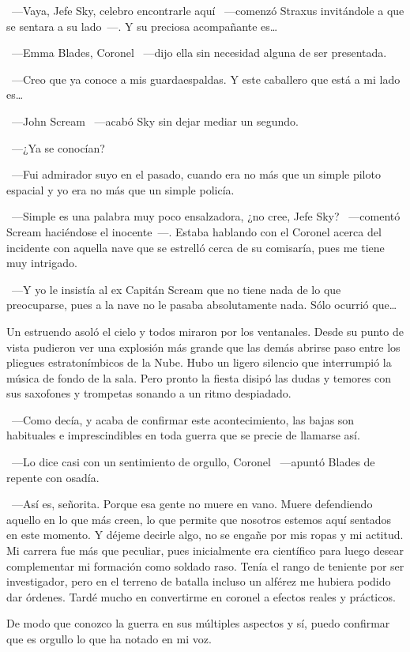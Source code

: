 ~---Vaya, Jefe Sky, celebro encontrarle aquí ~---comenzó Straxus invitándole a que se sentara a su lado~---. Y su preciosa acompañante es\dots

~---Emma Blades, Coronel ~---dijo ella sin necesidad alguna de ser presentada.

~---Creo que ya conoce a mis guardaespaldas. Y este caballero que está a mi lado es\dots

~---John Scream ~---acabó Sky sin dejar mediar un segundo.

~---¿Ya se conocían?

~---Fui admirador suyo en el pasado, cuando era no más que un simple piloto espacial y yo era no más que un simple policía.

~---Simple es una palabra muy poco ensalzadora, ¿no cree, Jefe Sky? ~---comentó Scream haciéndose el inocente~---. Estaba hablando con el Coronel acerca del incidente con aquella nave que se estrelló cerca de su comisaría, pues me tiene muy intrigado.

~---Y yo le insistía al ex Capitán Scream que no tiene nada de lo que preocuparse, pues a la nave no le pasaba absolutamente nada. Sólo ocurrió que\dots

Un estruendo asoló el cielo y todos miraron por los ventanales. Desde su punto de vista pudieron ver una explosión más grande que las demás abrirse paso entre los pliegues estratonímbicos de la Nube. Hubo un ligero silencio que interrumpió la música de fondo de la sala. Pero pronto la fiesta disipó las dudas y temores con sus saxofones y trompetas sonando a un ritmo despiadado.

~---Como decía, y acaba de confirmar este acontecimiento, las bajas son habituales e imprescindibles en toda guerra que se precie de llamarse así.

~---Lo dice casi con un sentimiento de orgullo, Coronel ~---apuntó Blades de repente con osadía.

~---Así es, señorita. Porque esa gente no muere en vano. Muere defendiendo aquello en lo que más creen, lo que permite que nosotros estemos aquí sentados en este momento. Y déjeme decirle algo, no se engañe por mis ropas y mi actitud. Mi carrera fue más que peculiar, pues inicialmente era científico para luego desear complementar mi formación como soldado raso. Tenía el rango de teniente por ser investigador, pero en el terreno de batalla incluso un alférez me hubiera podido dar órdenes. Tardé mucho en convertirme en coronel a efectos reales y prácticos.

\rquoti De modo que conozco la guerra en sus múltiples aspectos y sí, puedo confirmar que es orgullo lo que ha notado en mi voz.

